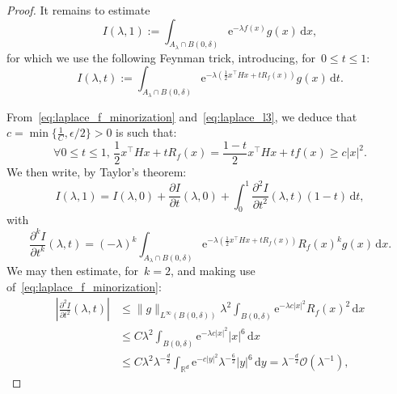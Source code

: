 \documentclass[10pt]{article}
\renewcommand{\d}{\mathrm{d}}
\newcommand{\e}{\mathrm{e}}
\newcommand{\R}{\mathbb{R}}
\newcommand{\1}{\mathbbm 1}
\renewcommand{\O}{\mathcal{O}}
\begin{document}
\begin{proof}
            It remains to estimate
            \begin{equation}
                I(\lambda,1) := \int_{A_\lambda \cap B(0,\delta)} \e^{-\lambda f(x)}g(x)\,\d x,
            \end{equation}
            for which we use the following Feynman trick, introducing, for~$0\leq t\leq 1$:
            \begin{equation}
                I(\lambda,t) := \int_{A_\lambda \cap B(0,\delta)} \e^{-\lambda\left(\frac12 x^\intercal H x + t R_f(x)\right)}g(x)\,\d t.
            \end{equation}

            From~\eqref{eq:laplace_f_minorization} and~\eqref{eq:laplace_l3}, we deduce that~$c = \min\{\frac1C,\epsilon/2\}>0$ is such that:
            \begin{equation}
                \label{eq:laplace_interpolation_positivity}
                \forall 0\leq t\leq 1,\,\frac 12x^\intercal H x + t R_f(x) = \frac{1-t}2x^\intercal H x + tf(x) \geq c|x|^2.
            \end{equation}
            We then write, by Taylor's theorem:
            \begin{equation}
                I(\lambda,1) = I(\lambda,0) + \frac{\partial I}{\partial t}(\lambda,0)  + \int_0^1 \frac{\partial^2 I}{\partial t^2}(\lambda,t)(1-t)\,\d t,
            \end{equation}
            with
            \begin{equation}
                \frac{\partial^k I}{\partial t^k}(\lambda, t) = (-\lambda)^k\int_{A_\lambda \cap B(0,\delta)} \e^{-\lambda\left(\frac12x^\intercal H x +tR_f(x)\right)}R_f(x)^k g(x)\,\d x.
            \end{equation}
            We may then estimate, for~$k=2$, and making use of~\eqref{eq:laplace_f_minorization}:
            \begin{equation}
                \label{eq:laplace_error_a}
                \begin{aligned}
                    \left|\frac{\partial^2 I}{\partial t^2}(\lambda, t)\right| &\leq \|g\|_{L^\infty(B(0,\delta))} \lambda^2\int_{B(0,\delta)}\e^{-\lambda c|x|^2}R_f(x)^2\,\d x\\
                    &\leq C\lambda^2\int_{B(0,\delta)}\e^{- \lambda c|x|^2}|x|^6\,\d x\\
                    &\leq C \lambda^2 \lambda^{-\frac d2} \int_{\R^d} \e^{-c|y|^2} \lambda^{-\frac 62}|y|^6\,\d y = \lambda^{-\frac d2}\O(\lambda^{-1}),

\end{aligned}
\end{equation}
\end{proof}
\end{document}
